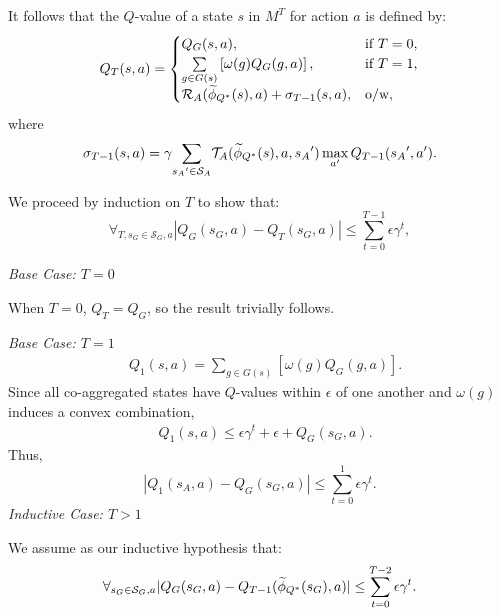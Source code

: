 It follows that the $Q$-value of a state $s$ in $M^T$ for action $a$ is defined by:
\begin{equation}
Q_T(s, a) = 
\begin{cases}
	   Q_G(s, a), &  \text{if } T=0,\\
	   \underset{g \in G(s)}{\sum} \left[ \omega(g)Q_G(g,a) \right], & \text{if } T = 1,\\
	   \mathcal{R}_A(\widetilde \phi_{Q^*}(s),a) + \sigma_{T-1}(s,a), &\text{o/w},
\end{cases}
\end{equation}
where
\begin{equation}
\sigma_{T-1}(s,a) = \gamma \underset{{s_A}' \in \mathcal{S}_A}{\sum} \mathcal{T}_A(\widetilde \phi_{Q^*}(s),a,{s_A}') \max_{a'} Q_{T-1}({s_A}', a').
\end{equation}

We proceed by induction on $T$ to show that:
\begin{equation}
\forall_{T, s_G \in \mathcal{S}_G, a} |Q_G(s_G, a) - Q_T(s_G, a)| \leq \sum_{t=0}^{T-1} \epsilon \gamma^{t},
\end{equation}

\textit{Base Case: $T = 0$}

When $T = 0$, $Q_T = Q_G$, so the result trivially follows.

\textit{Base Case: $T = 1$}
\begin{align*}
&Q_1(s,a) = \underset{g \in G(s)}{\sum} \left[ \omega(g)Q_G(g,a) \right].
\end{align*}
Since all co-aggregated states have $Q$-values within $\epsilon$ of one another and $\omega(g)$ induces a convex combination,
\begin{align*}
&Q_1(s,a) \leq \epsilon \gamma^t + \epsilon + Q_G(s_G, a).
\end{align*}
Thus,
\begin{equation}
\left| Q_{1}(s_A, a) - Q_G(s_G,a) \right| \leq \sum_{t=0}^{1}\epsilon \gamma^t.
\end{equation}
\textit{Inductive Case: $T > 1$}

We assume as our inductive hypothesis that:
\begin{equation}
\forall_{s_G \in \mathcal{S}_G, a} |Q_G(s_G, a) - Q_{T-1}(\widetilde \phi_{Q^*}(s_G), a)| \leq \sum_{t=0}^{T-2} \epsilon \gamma^t.
\end{equation}

